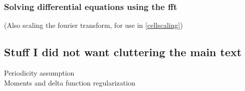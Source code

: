 \documentclass[a4paper,
twoside=false,abstract=false,numbers=noenddot,
titlepage=false,headings=small,parskip=half,version=last]{scrartcl}
\begin{document}
\subsubsection{Solving differential equations using the fft}
(Also scaling the fourier transform, for use in \ref{cellscaling})
\subsection{Stuff I did not want cluttering the main text}
Periodicity assumption\\
Moments and delta function regularization
\end{document}
